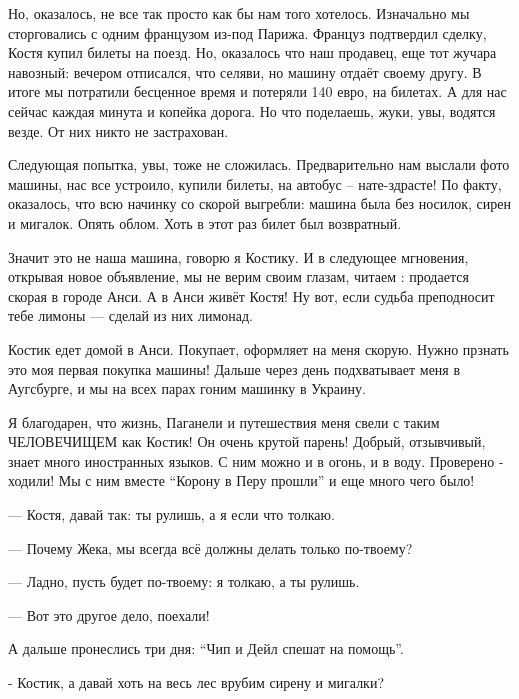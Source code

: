 
Но, оказалось, не все так просто как бы нам того хотелось. Изначально мы
сторговались с одним французом из-под Парижа.  Француз подтвердил сделку,
Костя купил билеты на поезд. Но, оказалось что наш продавец, еще тот жучара
навозный:  вечером отписался, что селяви, но машину отдаёт своему другу.  В
итоге мы потратили бесценное время и потеряли 140 евро, на билетах. А для нас
сейчас  каждая минута и копейка дорога. Но что поделаешь, жуки, увы, водятся
везде. От них никто не застрахован. 


Следующая попытка, увы, тоже не сложилась. Предварительно нам выслали фото
машины, нас все устроило,  купили билеты, на автобус – нате-здрасте! По факту,
оказалось, что всю начинку со скорой выгребли: машина была без носилок, сирен и
мигалок. Опять облом. Хоть в этот раз билет был возвратный. 

Значит это не наша машина, говорю я Костику. И в следующее мгновения, открывая
новое объявление, мы не верим своим глазам, читаем : продается скорая в городе
Анси.  А в Анси живёт Костя! Ну вот, если судьба преподносит тебе лимоны —
сделай из них лимонад.


Костик едет домой в Анси. Покупает, оформляет на меня скорую. Нужно прзнать это
моя первая покупка машины! Дальше через день подхватывает меня в Аугсбурге, и
мы на всех парах гоним машинку в Украину.

Я благодарен, что жизнь, Паганели и путешествия меня свели с таким ЧЕЛОВЕЧИЩЕМ
как Костик! Он очень крутой парень! Добрый, отзывчивый, знает много иностранных
языков. С ним можно и в огонь, и в воду. Проверено - ходили! Мы с ним вместе
\enquote{Корону в Перу прошли} и еще много чего было!

— Костя, давай так: ты рулишь, а я если что толкаю.

— Почему Жека, мы всегда всё должны делать только по-твоему?

— Ладно, пусть будет по-твоему: я толкаю, а ты рулишь.

— Вот это другое дело, поехали!

А дальше пронеслись три дня: \enquote{Чип и Дейл спешат на помощь}.  

- Костик, а давай хоть на весь лес врубим сирену и мигалки?

